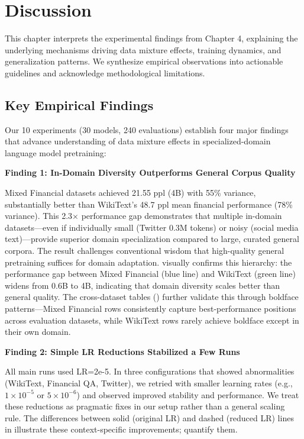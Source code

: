 \chapter{Discussion}

This chapter interprets the experimental findings from Chapter 4, explaining the underlying mechanisms driving data mixture effects, training dynamics, and generalization patterns. We synthesize empirical observations into actionable guidelines and acknowledge methodological limitations.

\section{Key Empirical Findings}

Our 10 experiments (30 models, 240 evaluations) establish four major findings that advance understanding of data mixture effects in specialized-domain language model pretraining:

\textbf{Finding 1: In-Domain Diversity Outperforms General Corpus Quality}

Mixed Financial datasets achieved 21.55 ppl (4B) with 55\% variance, substantially better than WikiText's 48.7 ppl mean financial performance (78\% variance). This 2.3$\times$ performance gap demonstrates that multiple in-domain datasets—even if individually small (Twitter 0.3M tokens) or noisy (social media text)—provide superior domain specialization compared to large, curated general corpora. The result challenges conventional wisdom that high-quality general pretraining suffices for domain adaptation.  visually confirms this hierarchy: the performance gap between Mixed Financial (blue line) and WikiText (green line) widens from 0.6B to 4B, indicating that domain diversity scales better than general quality. The cross-dataset tables () further validate this through boldface patterns—Mixed Financial rows consistently capture best-performance positions across evaluation datasets, while WikiText rows rarely achieve boldface except in their own domain.

\textbf{Finding 2: Simple LR Reductions Stabilized a Few Runs}

All main runs used LR=2e-5. In three configurations that showed abnormalities (WikiText, Financial QA, Twitter), we retried with smaller learning rates (e.g., $1\times10^{-5}$ or $5\times10^{-6}$) and observed improved stability and performance. We treat these reductions as pragmatic fixes in our setup rather than a general scaling rule. The differences between solid (original LR) and dashed (reduced LR) lines in  illustrate these context-specific improvements;  quantify them.

